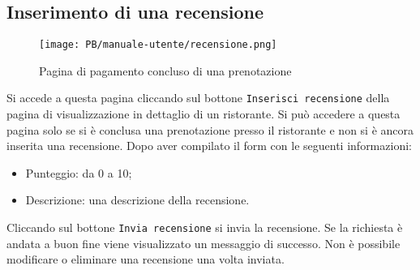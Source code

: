 \subsection{Inserimento di una recensione}

\begin{figure}[htbp]
    \centering
	\texttt{[image: PB/manuale-utente/recensione.png]}
    \caption{Pagina di pagamento concluso di una prenotazione}
\end{figure}

Si accede a questa pagina cliccando sul bottone \texttt{Inserisci recensione} della
pagina di visualizzazione in dettaglio di un ristorante. Si può accedere a
questa pagina solo se si è conclusa una prenotazione presso il ristorante e non
si è ancora inserita una recensione. Dopo aver compilato il form con le seguenti
informazioni:
\begin{itemize}
	\item Punteggio: da 0 a 10;
	\item Descrizione: una descrizione della recensione.
\end{itemize}

Cliccando sul bottone \texttt{Invia recensione} si invia la recensione. Se la
richiesta è andata a buon fine viene visualizzato un messaggio di successo. Non
è possibile modificare o eliminare una recensione una volta inviata.
